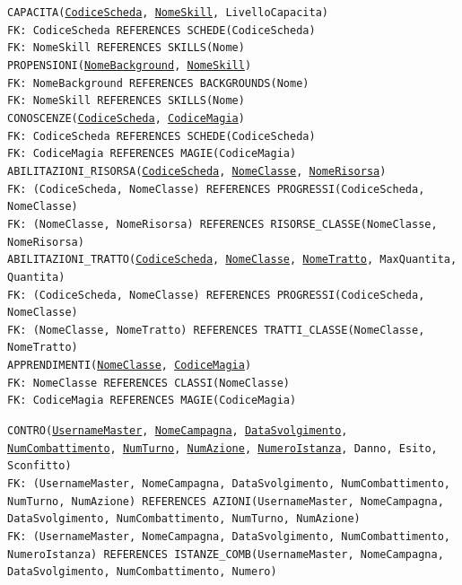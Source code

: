 \documentclass[a4paper,12pt]{report}
\begin{document}
\noindent \texttt{CAPACITA(\underline{CodiceScheda}, \underline{NomeSkill}, LivelloCapacita)} \\
\texttt{FK: CodiceScheda REFERENCES SCHEDE(CodiceScheda)} \\
\texttt{FK: NomeSkill REFERENCES SKILLS(Nome)} \\

\noindent \texttt{PROPENSIONI(\underline{NomeBackground}, \underline{NomeSkill})} \\
\texttt{FK: NomeBackground REFERENCES BACKGROUNDS(Nome)} \\
\texttt{FK: NomeSkill REFERENCES SKILLS(Nome)} \\

\noindent \texttt{CONOSCENZE(\underline{CodiceScheda}, \underline{CodiceMagia})} \\
\texttt{FK: CodiceScheda REFERENCES SCHEDE(CodiceScheda)} \\
\texttt{FK: CodiceMagia REFERENCES MAGIE(CodiceMagia)} \\

\noindent \texttt{ABILITAZIONI\_RISORSA(\underline{CodiceScheda}, \underline{NomeClasse}, \underline{NomeRisorsa})} \\
\texttt{FK: (CodiceScheda, NomeClasse) REFERENCES PROGRESSI(CodiceScheda, NomeClasse)} \\
\texttt{FK: (NomeClasse, NomeRisorsa) REFERENCES RISORSE\_CLASSE(NomeClasse, NomeRisorsa)} \\

\noindent \texttt{ABILITAZIONI\_TRATTO(\underline{CodiceScheda}, \underline{NomeClasse}, \underline{NomeTratto}, MaxQuantita, Quantita)} \\
\texttt{FK: (CodiceScheda, NomeClasse) REFERENCES PROGRESSI(CodiceScheda, NomeClasse)} \\
\texttt{FK: (NomeClasse, NomeTratto) REFERENCES TRATTI\_CLASSE(NomeClasse, NomeTratto)} \\

\noindent \texttt{APPRENDIMENTI(\underline{NomeClasse}, \underline{CodiceMagia})} \\
\texttt{FK: NomeClasse REFERENCES CLASSI(NomeClasse)} \\
\texttt{FK: CodiceMagia REFERENCES MAGIE(CodiceMagia)} \\

\newpage

\noindent \texttt{CONTRO(\underline{UsernameMaster}, \underline{NomeCampagna}, \underline{DataSvolgimento}, \underline{NumCombattimento}, \underline{NumTurno}, \underline{NumAzione}, \underline{NumeroIstanza}, Danno, Esito, Sconfitto)} \\
\texttt{FK: (UsernameMaster, NomeCampagna, DataSvolgimento, NumCombattimento, NumTurno, NumAzione) REFERENCES AZIONI(UsernameMaster, NomeCampagna, DataSvolgimento, NumCombattimento, NumTurno, NumAzione)} \\
\texttt{FK: (UsernameMaster, NomeCampagna, DataSvolgimento, NumCombattimento, NumeroIstanza) REFERENCES ISTANZE\_COMB(UsernameMaster, NomeCampagna, DataSvolgimento, NumCombattimento, Numero)} \\
\end{document}
